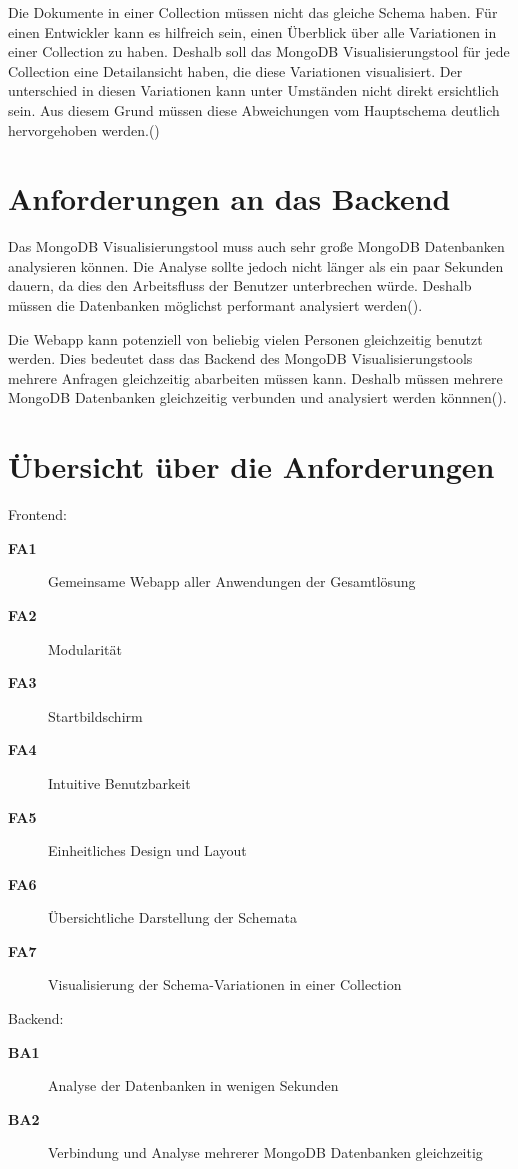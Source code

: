 Die Dokumente in einer Collection müssen nicht das gleiche Schema haben.
Für einen Entwickler kann es hilfreich sein, einen Überblick über alle Variationen in einer Collection zu haben.
Deshalb soll das MongoDB Visualisierungstool für jede Collection eine Detailansicht haben, die diese Variationen visualisiert.
Der unterschied in diesen Variationen kann unter Umständen nicht direkt ersichtlich sein.
Aus diesem Grund müssen diese Abweichungen vom Hauptschema deutlich hervorgehoben werden.()

\section{Anforderungen an das Backend}
\label{sec:anf_backend}

Das MongoDB Visualisierungstool muss auch sehr große MongoDB Datenbanken analysieren können.
Die Analyse sollte jedoch nicht länger als ein paar Sekunden dauern, da dies den Arbeitsfluss der Benutzer unterbrechen würde.
Deshalb müssen die Datenbanken möglichst performant analysiert werden().

Die Webapp kann potenziell von beliebig vielen Personen gleichzeitig benutzt werden.
Dies bedeutet dass das Backend des MongoDB Visualisierungstools mehrere Anfragen gleichzeitig abarbeiten müssen kann.
Deshalb müssen mehrere MongoDB Datenbanken gleichzeitig verbunden und analysiert werden könnnen().


\section{Übersicht über die Anforderungen}
\label{sec:anf_uebersicht}

Frontend:

\begin{description}
    \item[\textbf{FA1}\label{itm:fa1}] Gemeinsame Webapp aller Anwendungen der Gesamtlösung
    \item[\textbf{FA2}\label{itm:fa2}] Modularität
    \item[\textbf{FA3}\label{itm:fa3}] Startbildschirm
    \item[\textbf{FA4}\label{itm:fa4}] Intuitive Benutzbarkeit
    \item[\textbf{FA5}\label{itm:fa5}] Einheitliches Design und Layout
    \item[\textbf{FA6}\label{itm:fa6}] Übersichtliche Darstellung der Schemata
    \item[\textbf{FA7}\label{itm:fa7}] Visualisierung der Schema-Variationen in einer Collection
\end{description}

Backend:

\begin{description}
    \item[\textbf{BA1}\label{itm:ba1}] Analyse der Datenbanken in wenigen Sekunden
    \item[\textbf{BA2}\label{itm:ba2}] Verbindung und Analyse mehrerer MongoDB Datenbanken gleichzeitig
\end{description}

